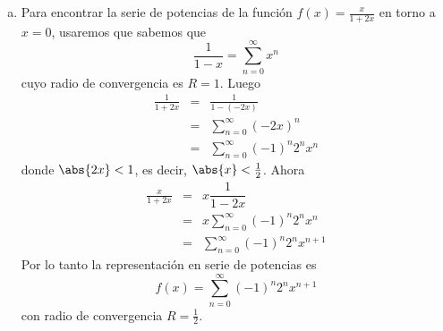 \documentclass{article}
\begin{document}
\begin{enumerate}[a)]
  \item Para encontrar la serie de potencias de la función $f(x)=\frac{x}{1+2x}$ en torno a $x=0$, usaremos que sabemos que
  $$\dfrac{1}{1-x}=\sum_{n=0}^{\infty}x^n$$
  cuyo radio de convergencia es $R=1$. Luego
  \begin{eqnarray*}
    \frac{1}{1+2x} 
      &=& \frac{1}{1-(-2x)}\\
      &=& \sum_{n=0}^{\infty}(-2x)^n\\
      &=& \sum_{n=0}^{\infty}(-1)^n2^nx^n
  \end{eqnarray*}
  donde $\abs{2x}<1$, es decir, $\abs{x}<\frac{1}{2}$. Ahora
  \begin{eqnarray*}
    \frac{x}{1+2x} 
      &=& x\dfrac{1}{1-2x}\\
      &=& x\sum_{n=0}^{\infty}(-1)^n2^nx^n\\
      &=& \sum_{n=0}^{\infty}(-1)^n2^nx^{n+1}
  \end{eqnarray*}
  Por lo tanto la representación en serie de potencias es
  $$f(x)=\sum_{n=0}^{\infty}(-1)^n2^nx^{n+1}$$
  con radio de convergencia $R=\frac{1}{2}$.

\end{enumerate}
\end{document}
